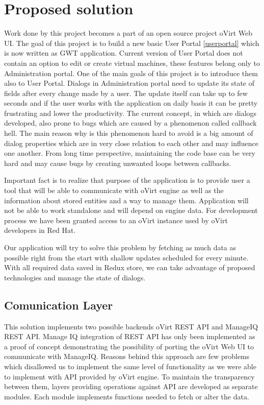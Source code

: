 \chapter{Proposed solution}
Work done by this project becomes a part of an open source project oVirt Web UI. The goal of this project is to build a new basic User Portal \ref{userportal} which is now written as GWT\cite{gwt} application.
Current version of User Portal does not contain an option to edit or create virtual machines, these features belong only to Administration portal. One of the main goals of this project is to introduce them also to User Portal.
Dialogs in Administration portal need to update its state of fields after every change made by a user. The update itself can take up to few seconds and if the user works with the application on daily basis it can be pretty frustrating and lower the productivity. 
The current concept, in which are dialogs developed, also prone to bugs which are caused by a phenomenon called callback hell\cite{callback_hell}. The main reason why is this phenomenon hard to avoid is a big amount of dialog properties which are in very close relation to each other and may influence one another. From long time perspective, maintaining the code base can be very hard and may cause bugs by creating unwanted loops between callbacks. 

Important fact is to realize that purpose of the application is to provide user a tool that will be able to communicate with oVirt engine as well as the information about stored entities and a way to manage them. Application will not be able to work standalone and will depend on engine data. For development process we have been granted access to an oVirt instance used by oVirt developers in Red Hat.  

Our application will try to solve this problem by fetching as much data as possible right from the start with shallow updates scheduled for every minute. With all required data saved in Redux store, we can take advantage of proposed technologies and manage the state of dialogs.

\section{Comunication Layer}
This solution implements two possible backends oVirt REST API and ManageIQ REST API. Manage IQ integration of REST API has only been implemented as a proof of concept demonstrating the possibility of porting the oVirt Web UI to communicate with ManageIQ. Reasons behind this approach are few problems which disallowed us to implement the same level of functionality as we were able to implement with API provided by oVirt engine. To maintain the transparency between them, layers providing operations against API are developed as separate modules. Each module implements functions needed to fetch or alter the data.


